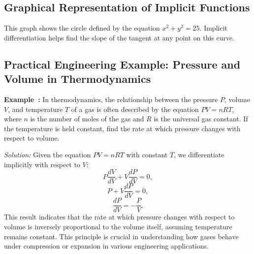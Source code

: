 \documentclass[a4paper,12pt]{book}
\newenvironment{solution}[1][]
{\par\noindent\textit{Solution:} \rmfamily}{\medskip}
\newcounter{example}
\newenvironment{example}[1][\theexample]
  {\refstepcounter{example}\par\medskip\noindent\textbf{Example~#1:} \rmfamily}
  {\medskip}
\begin{document}
\subsection{Graphical Representation of Implicit Functions}

\begin{center}
\end{center}

This graph shows the circle defined by the equation \( x^2 + y^2 = 25 \). Implicit differentiation helps find the slope of the tangent at any point on this curve.

\subsection{Practical Engineering Example: Pressure and Volume in Thermodynamics}

\begin{example}
In thermodynamics, the relationship between the pressure \( P \), volume \( V \), and temperature \( T \) of a gas is often described by the equation \( PV = nRT \), where \( n \) is the number of moles of the gas and \( R \) is the universal gas constant. If the temperature is held constant, find the rate at which pressure changes with respect to volume.
\end{example}

\begin{solution}
Given the equation \( PV = nRT \) with constant \( T \), we differentiate implicitly with respect to \( V \):
\[ P\frac{dV}{dV} + V\frac{dP}{dV} = 0, \]
\[ P + V\frac{dP}{dV} = 0, \]
\[ \frac{dP}{dV} = -\frac{P}{V}. \]
This result indicates that the rate at which pressure changes with respect to volume is inversely proportional to the volume itself, assuming temperature remains constant. This principle is crucial in understanding how gases behave under compression or expansion in various engineering applications.
\end{solution}
\end{document}
